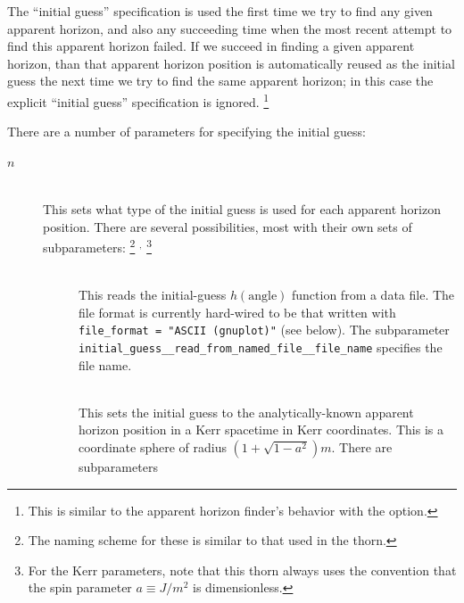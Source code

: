 The ``initial guess'' specification is used the first time we try to
find any given apparent horizon, and also any succeeding time when the
most recent attempt to find this apparent horizon failed.  If we succeed
in finding a given apparent horizon, than that apparent horizon position
is automatically reused as the initial guess the next time we try to
find the same apparent horizon; in this case the explicit ``initial guess''
specification is ignored.%
\footnote{%
	 This is similar to the  apparent
	 horizon finder's behavior with the
	 option.
	 }%

There are a number of parameters for specifying the initial guess:
\begin{description}
\item[\code{initial\_guess\_method[}$n$\code{]}]
\mbox{}\\
	This sets what type of the initial guess is used for each
	apparent horizon position.
	There are several possibilities, most with their own sets
	of subparameters:%
\footnote{%
	 The naming scheme for these is similar to
	 that used in the  thorn.
	 }%
$^,$%
\footnote{%
	 For the Kerr parameters, note that this thorn
	 always uses the convention that the spin parameter
	 $a \equiv J/m^2$ is dimensionless.
	 }%
	\begin{description}
	\item[]
	\mbox{}\\
		This reads the initial-guess $h(\text{angle})$ function
		from a data file.  The file format is currently hard-wired
		to be that written with \verb|file_format = "ASCII (gnuplot)"|
		(see below).  The subparameter
		\verb|initial_guess__read_from_named_file__file_name|
		specifies the file name.
	\item[]
	\mbox{}\\
		This sets the initial guess to the analytically-known
		apparent horizon position in a Kerr spacetime
		in Kerr coordinates.  This is a coordinate sphere
		of radius $(1 + \sqrt{1 - a^2}) m$.
		There are subparameters
		\begin{description}
		\item[%
		     \begin{tabular}{@{}l@{}}
		     \code{initial\_guess\_\_Kerr\_Kerr\_\_x\_posn[}$n$\code{]} \\
		     \code{initial\_guess\_\_Kerr\_Kerr\_\_y\_posn[}$n$\code{]} \\
		     \code{initial\_guess\_\_Kerr\_Kerr\_\_z\_posn[}$n$\code{]} %

\end{tabular}
\end{description}
\end{description}
\end{description}
